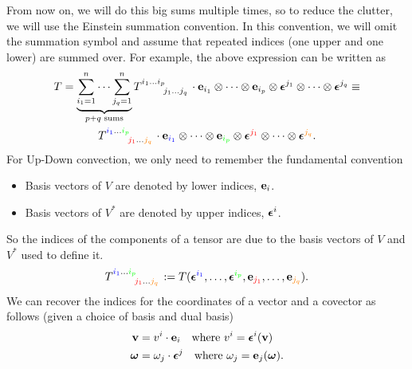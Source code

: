 From now on, we will do this big sums multiple times, so to reduce the clutter, we will use the Einstein summation convention. In this convention, we will omit the summation symbol and assume that repeated indices (one upper and one lower) are summed over. For example, the above expression can be written as
\begin{multline}
    T = \underbrace{\sum_{i_1 = 1}^{n} \cdots \sum_{j_q = 1}^{n}}_{p + q \text{ sums}} \tensor{T}{^{i_1 \ldots i_p}_{j_1 \ldots j_q}} \cdot \vb{e}_{i_1} \otimes \cdots \otimes \vb{e}_{i_p} \otimes \vb*{\epsilon}^{j_1} \otimes \cdots \otimes \vb*{\epsilon}^{j_q} \equiv \\
    \tensor{T}{^{\textcolor{blue}{i_1} \ldots \textcolor{green}{i_p}}_{\textcolor{red}{j_1} \ldots \textcolor{orange}{j_q}}} \cdot \vb{e}_{\textcolor{blue}{i_1}} \otimes \cdots \otimes \vb{e}_{\textcolor{green}{i_p}} \otimes \vb*{\epsilon}^{\textcolor{red}{j_1}} \otimes \cdots \otimes \vb*{\epsilon}^{\textcolor{orange}{j_q}}.
\end{multline}
For Up-Down convection, we only need to remember the fundamental convention \ie
\begin{itemize}
    \item Basis vectors of \(V\) are denoted by lower indices, \(\vb{e}_i\).
    \item Basis vectors of \(V^*\) are denoted by upper indices, \(\vb*{\epsilon}^i\).
\end{itemize}
So the indices of the components of a tensor are due to the basis vectors of \(V\) and \(V^*\) used to define it.
\begin{equation}
    \tensor{T}{^{\textcolor{blue}{i_1} \ldots \textcolor{green}{i_p}}_{\textcolor{red}{j_1} \ldots \textcolor{orange}{j_q}}} := T(\vb*{\epsilon}^{\textcolor{blue}{i_1}}, \ldots, \vb*{\epsilon}^{\textcolor{green}{i_p}}, \vb{e}_{\textcolor{red}{j_1}}, \ldots, \vb{e}_{\textcolor{orange}{j_q}}).
\end{equation}
We can recover the indices for the coordinates of a vector and a covector as follows (given a choice of basis and dual basis)
\begin{align}
    \vb{v}       & = v^i \cdot \vb{e}_i \quad \text{where } v^i = \vb*{\epsilon}^i(\vb{v})                  \\
    \vb*{\omega} & = \omega_j \cdot \vb*{\epsilon}^j \quad \text{where } \omega_j = \vb{e}_j(\vb*{\omega}).
\end{align}
